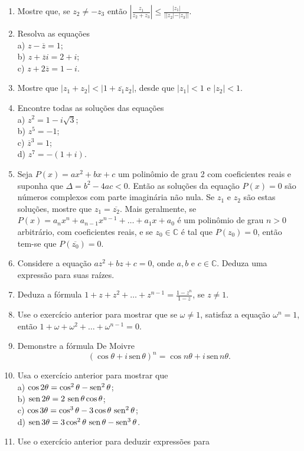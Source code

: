 \begin{enumerate}[leftmargin=*]
	\item Mostre que, se $z_2\neq -z_3$ então $\displaystyle\left|\frac{z_1}{z_2+z_3}\right|\leq \frac{|z_1|}{||z_2|-|z_3||}$.\\
	\item Resolva as equações\\ a) $z-\overline{z}=1$;\\ b) $z+\overline{z}i=2+i$;\\ c) $z+2\overline{z}=1-i$.
	\item Mostre que $|z_1+z_2|< |1+\overline{z_1}z_2|$, desde que $|z_1|< 1$ e $|z_2|<1$.
	\item Encontre todas as soluções das equações\\ a) $z^2=1-i\sqrt{3}$;\\ b) $z^5=-1$;\\ c) $\overline{z}^3=1$;\\ d) $z^7=-(1+i)$.
	\item Seja $P(x)=ax^2+bx+c$ um polinômio de grau 2 com coeficientes reais e suponha que $\Delta=b^2-4ac<0$. Então 
	as soluções da equação $P(x)=0$ são números complexos com parte imaginária não nula. Se $z_1$ e $z_2$ são estas soluções,
	mostre que $z_1=\overline{z_2}$. Mais geralmente, se $P(x)=a_nx^n+a_{n-1}x^{n-1}+\ldots+a_1x+a_0$ é um polinômio de 
	grau $n>0$ arbitrário, com coeficientes reais, e se $z_0\in \mathbb{C}$ é tal que $P(z_0)=0$, então tem-se que 
	$P(\overline{z_0})=0$. 
	\item Considere a equação $az^2+bz+c=0$, onde $a,b$ e $c\in \mathbb{C}$. Deduza uma expressão para suas raízes.
	\item Deduza a fórmula $1+z+z^2+\ldots+z^{n-1}=\displaystyle\frac{1-z^n}{1-z}$, se $z\neq 1$.
	\item Use o exercício anterior para mostrar que se $\omega\neq 1$, satisfaz a equação $\omega^n=1$, então 
	$1+\omega+\omega^2+\ldots+ \omega^{n-1}=0$.
	\item Demonstre a fórmula De Moivre 
	$$
	(\cos\theta+i\,\text{sen}\, \theta)^n=\cos n\theta+i\,\text{sen}\, n\theta.
	$$
	\item Usa o exercício anterior para mostrar que \\
	a) $\cos 2\theta =\cos^2\theta-\operatorname{sen}^2\theta$;\\
	b) $\operatorname{sen} 2\theta =2\,\operatorname{sen}\theta\cos\theta$;\\
	c) $\cos 3\theta =\cos^3\theta-3\cos\theta\, \operatorname{sen}^2\theta$;\\
	d) $\operatorname{sen} 3\theta =3\cos^2\theta\,\operatorname{sen}\theta-\operatorname{sen}^3\theta$.
	\item Use o exercício anterior para deduzir expressões para 

\end{enumerate}

